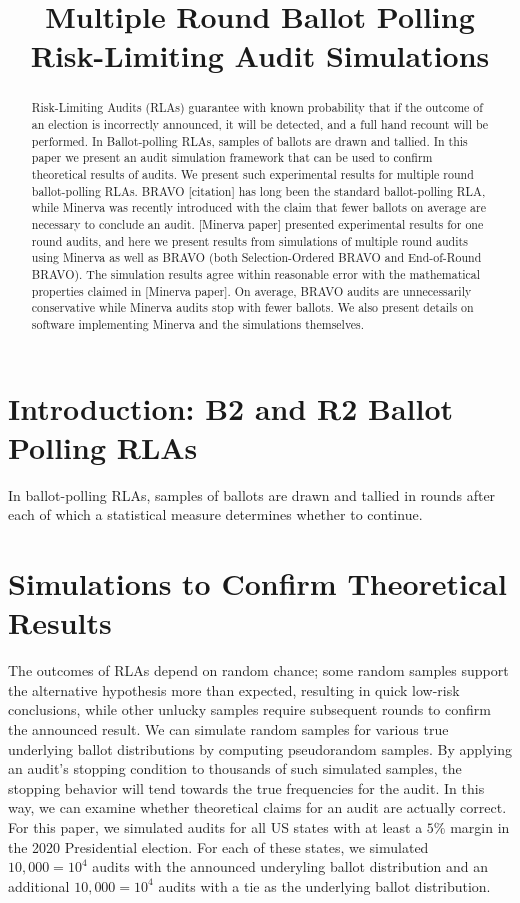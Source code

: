 \documentclass{article}
\title{Multiple Round Ballot Polling Risk-Limiting Audit Simulations}
\author{ }
\date{ }
\begin{document}
\maketitle

\begin{abstract}
    Risk-Limiting Audits (RLAs) guarantee with known probability 
    that if the outcome of an 
    election is incorrectly announced, it will be detected, 
    and a full hand recount will be performed. 
    In Ballot-polling RLAs, samples of ballots are drawn and tallied.
    In this paper we present an audit simulation framework
    that can be used to confirm theoretical results of audits.
    We present such experimental results for multiple round 
    ballot-polling RLAs.
    BRAVO [citation] has long been the standard ballot-polling RLA,
    while Minerva was recently introduced with the claim
    that fewer ballots on average are necessary to conclude 
    an audit.
    [Minerva paper] presented experimental
    results for one round audits, and here
    we present results
    from simulations of multiple round audits using Minerva 
    as well as BRAVO 
    (both Selection-Ordered 
    BRAVO and End-of-Round BRAVO).
    The simulation results agree within reasonable error with
    the mathematical properties claimed in [Minerva paper].
    On average, BRAVO audits are unnecessarily conservative 
    while Minerva audits stop with fewer ballots. We also
    present details on software implementing Minerva and
    the simulations themselves.
\end{abstract}

\section{Introduction: B2 and R2 Ballot Polling RLAs}
    In ballot-polling RLAs, samples of ballots are drawn and tallied
    in rounds
    after each of which a statistical measure determines whether to
    continue. 
 
\section{Simulations to Confirm Theoretical Results}
The outcomes of RLAs depend on random chance; some random samples
support the alternative hypothesis more than expected, resulting in 
quick low-risk conclusions, while other unlucky samples require subsequent
rounds to confirm the announced result.
We can simulate random samples for various true underlying ballot 
distributions by computing pseudorandom samples. 
By applying an audit's stopping condition to thousands of such
simulated samples, the stopping behavior will tend towards the true
frequencies for the audit. 
In this way, we can examine whether theoretical claims for an audit are
actually correct.
For this paper, we simulated audits for all US states with at least a $5\%$ 
margin in the 2020 Presidential election. 
For each of these states, we simulated 
$10,000=10^4$ audits with the announced
underyling ballot distribution
and an additional $10,000=10^4$ audits with a tie
as the underlying ballot distribution.
\end{document}
